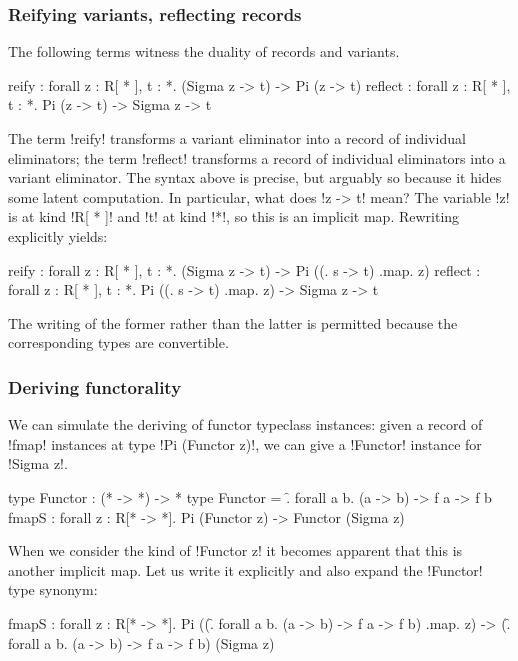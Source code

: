 \documentclass[sigplan,10pt,review]{acmart}\settopmatter{printfolios=true,printccs=false,printacmref=false}
\begin{document}
\subsubsection{Reifying variants, reflecting records} The following \RO terms witness the duality of records and variants. 

\begin{rosi}
reify : forall z : R[ * ], t : *. 
        (Sigma z -> t) -> Pi (z -> t)
reflect : forall z : R[ * ], t : *. 
          Pi (z -> t) -> Sigma z -> t
\end{rosi}

The term !reify! transforms a variant eliminator into a record of individual eliminators; the term !reflect! transforms a record of individual eliminators into a variant eliminator. The syntax above is precise, but arguably so because it hides some latent computation. In particular, what does !z -> t! mean? The variable !z! is at kind !R[ * ]! and !t! at kind !*!, so this is an implicit map. Rewriting explicitly yields: 

\begin{rosi}
  reify : forall z : R[ * ], t : *. 
          (Sigma z -> t) -> Pi ((\s. s -> t) .map. z)
reflect : forall z : R[ * ], t : *. 
          Pi ((\s. s -> t) .map. z) -> Sigma z -> t
\end{rosi}

\Ni The writing of the former rather than the latter is permitted because the corresponding types are convertible.


\subsubsection{Deriving functorality} We can simulate the deriving of functor typeclass instances: given a record of !fmap! instances at type !Pi (Functor z)!, we can give a !Functor! instance for !Sigma z!. 

\begin{rosi}
type Functor : (* -> *) -> *
type Functor = \f. forall a b. (a -> b) -> f a -> f b
fmapS : forall z : R[* -> *]. 
        Pi (Functor z) -> Functor (Sigma z)
\end{rosi}

\Ni When we consider the kind of !Functor z! it becomes apparent that this is another implicit map. Let us write it explicitly and also expand the !Functor! type synonym:

\begin{rosi}
fmapS : forall z : R[* -> *]. 
      Pi ((\f. forall a b. 
        (a -> b) -> f a -> f b) .map. z) -> 
      (\f. forall a b. (a -> b) -> f a -> f b) (Sigma z)
\end{rosi}
\end{document}
